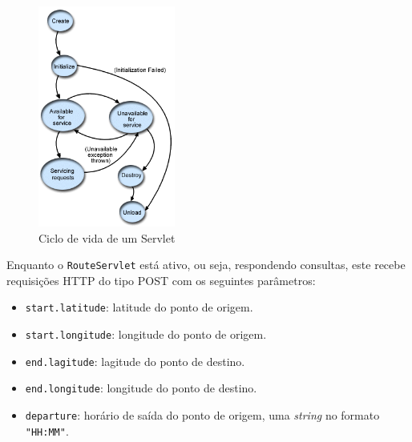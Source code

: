 \begin{figure}[!htb]
	\centering
	\includegraphics[width=0.4\textwidth]{./imgs/servletciclo.png}
	\caption[Ciclo de vida de um Servlet]{Ciclo de vida de um Servlet}
	\label{fig:servletciclo}
\end{figure}

Enquanto o \texttt{RouteServlet} está ativo, ou seja, respondendo consultas, este recebe requisições HTTP do tipo POST com os seguintes parâmetros:
\begin{itemize}
	\item \texttt{start.latitude}: latitude do ponto de origem.
	\item \texttt{start.longitude}: longitude do ponto de origem.
	\item \texttt{end.lagitude}: lagitude do ponto de destino.
	\item \texttt{end.longitude}: longitude do ponto de destino.
	\item \texttt{departure}: horário de saída do ponto de origem, uma \emph{string} no formato \texttt{"HH:MM"}.
\end{itemize}

